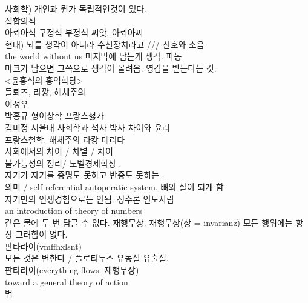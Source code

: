 \documentclass[11pt, a4paper]{article}
\begin{document}
사회학) 개인과 뭔가 독립적인것이 있다.\\
집합의식\\
아뢰아식 구정식 부정식 씨앗. 아뢰아씨\\
현대) 뇌를 생각이 아니라 수신장치라고 /// 신호와 소음\\
the world without us 마지막에 남는게 생각. 파동 \\
마크가 남으면 그쪽으로 생각이 몰려옴. 영감을 받는다는 것.\\ <윤홍식의 홍익학당>\\
들뢰즈, 라깡, 해체주의 \\
이정우\\
박홍규 형이상학 프랑스첧가\\
김미정 서울대 사회학과 석사 박사 차이와 윤리\\
프랑스철학. 해체주의 라캉 데리다\\
사회에서의 차이 / 차별 / 차이 \\
불가능성의 정리/ 노벨경제학상 . \\
자기가 자기를 증명도 못하고 반증도 못하는 .\\
의미 / self-referential autoperatic system. 뼈와 살이 되게 함 \\
자기만의 인생경험으로는 안됨. 정수론 인도사람\\
an introduction of theory of numbers\\
같은 물에 두 번 담글 수 없다. 재행무상. 재행무상(상 = invarianz) 모든 행위에는 항상 그러함이 없다.\\ 판타라이(vmffhxlsnt)\\
모든 것은 변한다 / 플로티누스 유동설 유출설.\\ 판타라이(everything flows. 재행무상)\\
toward a general theory of action\\
법\\
\end{document}
